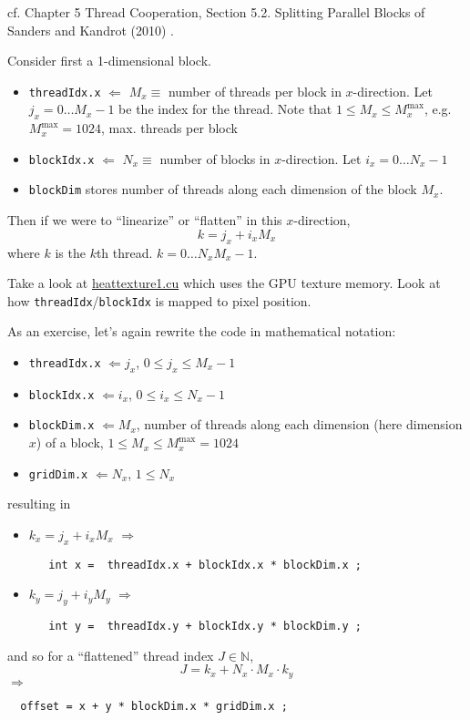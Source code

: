 \documentclass[10pt]{amsart}
\begin{document}
\begin{multicols*}{2}
cf. Chapter 5 Thread Cooperation, Section 5.2. Splitting Parallel Blocks of Sanders and Kandrot (2010) \cite{SK2010}.

Consider first a 1-dimensional block.

\begin{itemize}
\item \verb|threadIdx.x| $\Longleftarrow$ $M_x \equiv $ number of threads per block in $x$-direction.  Let $j_x = 0 \dots M_x-1$ be the index for the thread.  Note that $1 \leq M_x \leq M_x^{\text{max}}$, e.g. $M_x^{\text{max}} = 1024$, max. threads per block 
\item \verb|blockIdx.x| $\Longleftarrow$ $N_x \equiv $ number of blocks in $x$-direction.  Let $i_x = 0\dots N_x-1$
\item \verb|blockDim| stores number of threads along each dimension of the block $M_x$.  
  \end{itemize}

Then if we were to ``linearize'' or ``flatten'' in this $x$-direction,
\[
 k = j_x + i_x M_x
 \]
 where $k$ is the $k$th thread.  $k=0\dots N_xM_x -1$.

 Take a look at \href{https://github.com/ernestyalumni/CompPhys/blob/master/CUDA-By-Example/heattexture1.cu}{heattexture1.cu} which uses the GPU texture memory.  Look at how \verb|threadIdx|/\verb|blockIdx| is mapped to pixel position.

 As an exercise, let's again rewrite the code in mathematical notation:
 \begin{itemize}
\item \verb|threadIdx.x| $\Longleftarrow j_x$, $0\leq j_x \leq M_x -1$ 
\item \verb|blockIdx.x| $\Longleftarrow i_x$, $0\leq i_x \leq N_x -1$
\item \verb|blockDim.x| $\Longleftarrow M_x$, number of threads along each dimension (here dimension $x$) of a block, $1 \leq M_x \leq M_x^{\text{max}} = 1024$
\item \verb|gridDim.x| $\Longleftarrow N_x$, $1\leq N_x$
   \end{itemize}
 resulting in
 \begin{itemize}
 \item $k_x = j_x +i_x M_x$ $\Longrightarrow$
   \begin{lstlisting}
   int x =  threadIdx.x + blockIdx.x * blockDim.x ;
     \end{lstlisting}
\item $k_y = j_y +i_y M_y$ $\Longrightarrow$
   \begin{lstlisting}
   int y =  threadIdx.y + blockIdx.y * blockDim.y ;
     \end{lstlisting}
 \end{itemize}
 and so for a ``flattened'' thread index $J \in \mathbb{N}$,
 \[
J = k_x + N_x\cdot M_x \cdot k_y
\]
$\Longrightarrow $
\begin{lstlisting}
  offset = x + y * blockDim.x * gridDim.x ;
  \end{lstlisting}
 

\end{multicols*}
\end{document}
